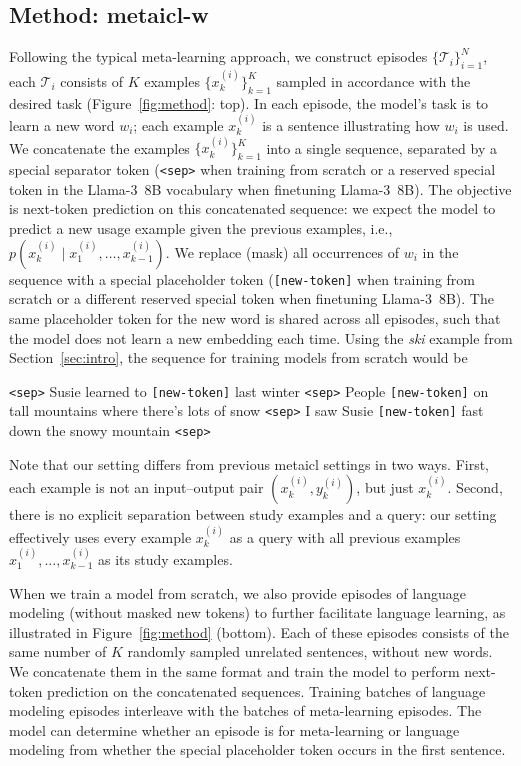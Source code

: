 \documentclass{article}
\begin{document}
\subsection{Method: \ac{metaicl-w}}
\label{sec:method}
Following the typical meta-learning approach, we construct episodes $\{\mathcal{T}_i\}_{i=1}^{N}$, each $\mathcal{T}_i$ consists of $K$ examples $\{x^{(i)}_k\}_{k=1}^{K}$ sampled in accordance with the desired task (Figure~\ref{fig:method}: top). In each episode, the model's task is to learn a new word $w_i$; each example $x^{(i)}_k$ is a sentence illustrating how $w_i$ is used. We concatenate the examples $\{x^{(i)}_k\}_{k=1}^{K}$ into a single sequence, separated by a special separator token (\texttt{<sep>} when training from scratch or a reserved special token in the \mbox{Llama-3 8B} vocabulary when finetuning \mbox{Llama-3 8B}). The objective is next-token prediction on this concatenated sequence: we expect the model to predict a new usage example given the previous examples, i.e., $p(x^{(i)}_k \mid x^{(i)}_1, \ldots, x^{(i)}_{k-1})$. We replace (mask) all occurrences of $w_i$ in the sequence with a special placeholder token (\texttt{[new-token]} when training from scratch or a different reserved special token when finetuning \mbox{Llama-3 8B}). The same placeholder token for the new word is shared across all episodes, such that the model does not learn a new embedding each time. Using the \emph{ski} example from Section~\ref{sec:intro}, the sequence for training models from scratch would be
\begin{displayquote}
\texttt{<sep>} Susie learned to \texttt{[new-token]} last winter \texttt{<sep>} People \texttt{[new-token]} on tall mountains where there's lots of snow \texttt{<sep>} I saw Susie \texttt{[new-token]} fast down the snowy mountain \texttt{<sep>}
\end{displayquote}
Note that our setting differs from previous \ac{metaicl} settings \citep{min-etal-2022-metaicl,chen-etal-2022-meta,Lake2023HumanlikeSG} in two ways. First, each example is not an input--output pair $(x^{(i)}_k, y^{(i)}_k)$, but just $x^{(i)}_k$. Second, there is no explicit separation between study examples and a query: our setting effectively uses every example $x^{(i)}_k$ as a query with all previous examples $x^{(i)}_1, \ldots, x^{(i)}_{k-1}$ as its study examples.

When we train a model from scratch, we also provide episodes of language modeling (without masked new tokens) to further facilitate language learning, as illustrated in Figure~\ref{fig:method} (bottom). Each of these episodes consists of the same number of $K$ randomly sampled unrelated sentences, without new words. We concatenate them in the same format and train the model to perform next-token prediction on the concatenated sequences. Training batches of language modeling episodes interleave with the batches of meta-learning episodes. The model can determine whether an episode is for meta-learning or language modeling from whether the special placeholder token occurs in the first sentence.
\end{document}
